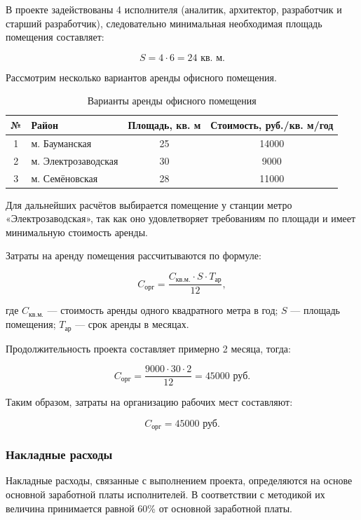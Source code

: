 В проекте задействованы 4 исполнителя (аналитик, архитектор,
разработчик и старший разработчик), следовательно минимальная
необходимая площадь помещения составляет:

\[
S = 4 \cdot 6 = 24 \text{ кв. м}.
\]

Рассмотрим несколько вариантов аренды офисного помещения.

\begin{table}[h]
\centering
\caption{Варианты аренды офисного помещения}
\label{tab:office}
\begin{tabular}{|c|p{5cm}|c|c|}
\hline
№ & Район & Площадь, кв. м & Стоимость, руб./кв. м/год \\ \hline
1 & м. Бауманская & 25 & 14000 \\ \hline
2 & м. Электрозаводская & 30 & 9000 \\ \hline
3 & м. Семёновская & 28 & 11000 \\ \hline
\end{tabular}
\end{table}

Для дальнейших расчётов выбирается помещение у станции метро
«Электрозаводская», так как оно удовлетворяет требованиям по площади
и имеет минимальную стоимость аренды.

Затраты на аренду помещения рассчитываются по формуле:

\begin{equation}
C_{\text{орг}} =
\frac{C_{\text{кв.м.}} \cdot S \cdot T_{\text{ар}}}{12},
\end{equation}

где $C_{\text{кв.м.}}$ — стоимость аренды одного квадратного метра в
год; $S$ — площадь помещения; $T_{\text{ар}}$ — срок аренды в месяцах.

Продолжительность проекта составляет примерно 2 месяца, тогда:

\[
C_{\text{орг}} =
\frac{9000 \cdot 30 \cdot 2}{12} = 45000 \text{ руб.}
\]

Таким образом, затраты на организацию рабочих мест составляют:

\begin{equation}
C_{\text{орг}} = 45000 \text{ руб.}
\end{equation}

\subsubsection*{Накладные расходы}

Накладные расходы, связанные с выполнением проекта, определяются на
основе основной заработной платы исполнителей. В соответствии с
методикой их величина принимается равной 60\% от основной заработной
платы.

